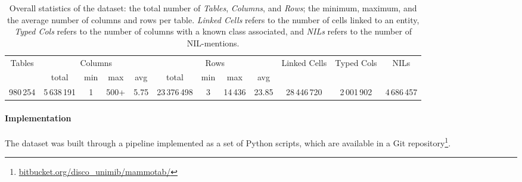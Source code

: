 \begin{table}[ht]
\centering
\scriptsize

\caption{Overall statistics of the \mammotab dataset: the total number of \textit{Tables}, \textit{Columns}, and \textit{Rows}; the minimum, maximum, and the average number of columns and rows per table. \textit{Linked Cells} refers to the number of cells linked to an entity, \textit{Typed Cols} refers to the number of columns with a known class associated, and \textit{NILs} refers to the number of NIL-mentions.}
\label{tab:characteristics-mamotab}
\begin{tabular}{|c|cccc|cccc|c|c|c|}
\hline
\multirow{2}{*}{Tables} &
  \multicolumn{4}{c|}{Columns} &
  \multicolumn{4}{c|}{Rows} &
  \multirow{2}{*}{Linked Cells} &
  \multirow{2}{*}{Typed Cols} &
  \multirow{2}{*}{NILs} \\ \cline{2-9}
 &
  \multicolumn{1}{c|}{total} &
  \multicolumn{1}{c|}{min} &
  \multicolumn{1}{c|}{max} &
  avg &
  \multicolumn{1}{c|}{total} &
  \multicolumn{1}{c|}{min} &
  \multicolumn{1}{c|}{max} &
  avg &
   &
   &
   \\ \hline
980\,254 &
  \multicolumn{1}{c|}{5\,638\,191} &
  \multicolumn{1}{c|}{1} &
  \multicolumn{1}{c|}{500+} &
  5.75 &
  \multicolumn{1}{c|}{23\,376\,498} &
  \multicolumn{1}{c|}{3} &
  \multicolumn{1}{c|}{14\,436} &
  23.85 &
  28\,446\,720 &
  2\,001\,902 &
  4\,686\,457 \\ \hline
\end{tabular}
\end{table}




\paragraph{Implementation}
\label{sec:implemetation}

The dataset was built through a pipeline implemented as a set of Python scripts, which are available in a Git repository\footnote{\href{https://bitbucket.org/disco\_unimib/mammotab/}{bitbucket.org/disco\_unimib/mammotab/}}.


